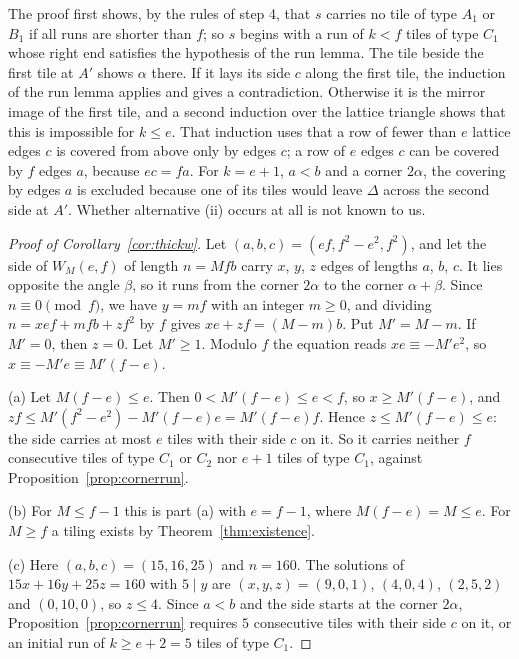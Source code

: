 \documentclass[11pt,reqno]{amsart}
\theoremstyle{plain}
\theoremstyle{definition}
\begin{document}
The proof first shows, by the rules of step 4, that $s$ carries no tile of
type $A_1$ or $B_1$ if all runs are shorter than $f$; so $s$ begins with a run of $k<f$ tiles of type $C_1$
whose right end satisfies the hypothesis of the run lemma. The tile beside the first tile at $A'$ shows
$\alpha$ there. If it lays its side $c$ along the first tile, the induction of the run lemma applies and
gives a contradiction. Otherwise it is the mirror image of the first tile, and a second induction over the
lattice triangle shows that this is impossible for $k\le e$. That induction uses that a row of fewer than $e$ lattice edges $c$ is covered from
above only by edges $c$; a row of $e$ edges $c$ can be covered by $f$ edges $a$, because $ec=fa$. For
$k=e+1$, $a<b$ and a corner $2\alpha$, the covering by edges $a$ is excluded because one of its tiles would
leave $\Delta$ across the second side at $A'$. Whether alternative \textup{(ii)} occurs at all is not known
to us.

\begin{proof}[Proof of Corollary~\ref{cor:thickw}]
Let $(a,b,c)=(ef,f^2-e^2,f^2)$, and let the side of $W_M(e,f)$ of length $n=Mfb$ carry $x$, $y$, $z$ edges
of lengths $a$, $b$, $c$. It lies opposite the angle $\beta$, so it runs from the corner $2\alpha$ to the
corner $\alpha+\beta$. Since $n\equiv0\pmod f$, we have $y=mf$ with an integer $m\ge0$, and dividing
$n=xef+mfb+zf^2$ by $f$ gives $xe+zf=(M-m)b$. Put $M'=M-m$. If $M'=0$, then $z=0$. Let $M'\ge1$. Modulo $f$
the equation reads $xe\equiv-M'e^2$, so $x\equiv-M'e\equiv M'(f-e)$.

(a) Let $M(f-e)\le e$. Then $0<M'(f-e)\le e<f$, so $x\ge M'(f-e)$, and
$zf\le M'(f^2-e^2)-M'(f-e)e=M'(f-e)f$. Hence $z\le M'(f-e)\le e$: the side carries at most $e$ tiles with
their side $c$ on it. So it carries neither $f$ consecutive tiles of type $C_1$ or $C_2$ nor $e+1$ tiles of
type $C_1$, against Proposition~\ref{prop:cornerrun}.

(b) For $M\le f-1$ this is part (a) with $e=f-1$, where $M(f-e)=M\le e$. For $M\ge f$ a tiling exists by
Theorem~\ref{thm:existence}.

(c) Here $(a,b,c)=(15,16,25)$ and $n=160$. The solutions of $15x+16y+25z=160$ with $5\mid y$ are
$(x,y,z)=(9,0,1)$, $(4,0,4)$, $(2,5,2)$ and $(0,10,0)$, so $z\le4$. Since $a<b$ and the side starts at the
corner $2\alpha$, Proposition~\ref{prop:cornerrun} requires $5$ consecutive tiles with their side $c$ on it,
or an initial run of $k\ge e+2=5$ tiles of type $C_1$.
\end{proof}
\end{document}
